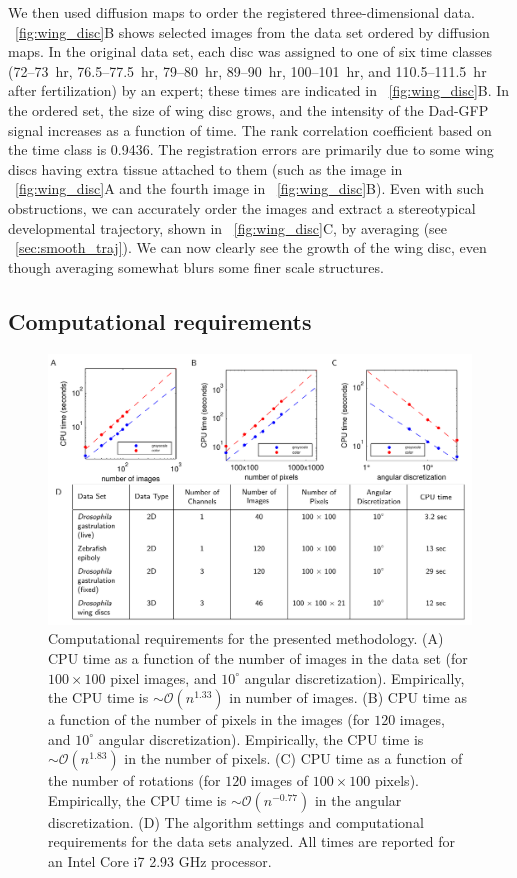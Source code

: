 We then used diffusion maps to order the registered three-dimensional data.
%
\fig~\ref{fig:wing_disc}B shows selected images from the data set ordered by diffusion maps.
%
In the original data set, each disc was assigned to one of six time classes (72--73~hr, 76.5--77.5~hr, 79--80~hr, 89--90~hr, 100--101~hr, and 110.5--111.5~hr after fertilization) by an expert; these times are indicated in \fig~\ref{fig:wing_disc}B.
%
In the ordered set, the size of wing disc grows, and the intensity of the Dad-GFP signal increases as a function of time.
%
The rank correlation coefficient based on the time class is 0.9436.
%
The registration errors are primarily due to some wing discs having extra tissue attached to them (such as the image in \fig~\ref{fig:wing_disc}A and the fourth image in \fig~\ref{fig:wing_disc}B).
%
Even with such obstructions, we can accurately order the images and extract a stereotypical developmental trajectory, shown in \fig~\ref{fig:wing_disc}C, by averaging (see \sec~\ref{sec:smooth_traj}).
%
We can now clearly see the growth of the wing disc, even though averaging somewhat blurs some finer scale structures.


\subsection{Computational requirements}

\begin{figure}[t]
\includegraphics[width=\textwidth]{fig7}
\caption[Computational requirements for registration and ordering of biological images]{Computational requirements for the presented methodology. (A) CPU time as a function of the number of images in the data set (for $100 \times 100$ pixel images, and $10^\circ$ angular discretization). Empirically, the CPU time is $\sim \mathcal{O}(n^{1.33})$ in number of images. (B) CPU time as a function of the number of pixels in the images (for $120$ images, and $10^\circ$ angular discretization). Empirically, the CPU time is $\sim \mathcal{O}(n^{1.83})$ in the number of pixels. (C) CPU time as a function of the number of rotations (for $120$ images of $100 \times 100$ pixels). Empirically, the CPU time is $\sim \mathcal{O}(n^{-0.77})$ in the angular discretization. (D) The algorithm settings and computational requirements for the data sets analyzed. All times are reported for an Intel Core i7 2.93 GHz processor.}
\label{fig:cpu_time}
\end{figure}


